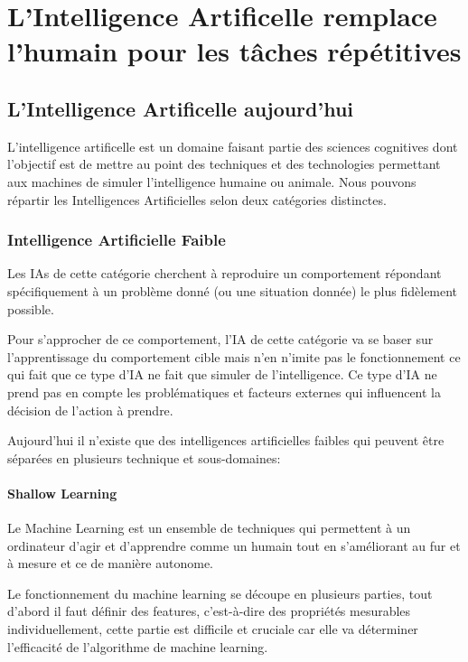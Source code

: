 \part{L'Intelligence Artificelle remplace l'humain pour les tâches répétitives}
\chapter{L'Intelligence Artificelle aujourd'hui}
    L'intelligence artificelle est un domaine faisant partie
    des sciences cognitives dont l'objectif est de mettre au
    point des techniques et des technologies permettant aux
    machines de simuler l'intelligence humaine ou animale.
    Nous pouvons répartir les Intelligences Artificielles selon deux catégories distinctes.

    \section{Intelligence Artificielle Faible}
        Les IAs de cette catégorie cherchent à reproduire un comportement
        répondant spécifiquement à un problème donné (ou une situation donnée)
        le plus fidèlement possible.\newline

        Pour s'approcher de ce comportement, l'IA de cette catégorie
        va se baser sur l'apprentissage du comportement cible
        mais n'en n'imite pas le fonctionnement ce qui fait que
        ce type d'IA ne fait que simuler de l'intelligence.
        Ce type d'IA ne prend pas en compte les problématiques et facteurs externes
        qui influencent la décision de l'action à prendre. \newline

        Aujourd'hui il n'existe que des intelligences artificielles faibles qui peuvent
        être séparées en plusieurs technique et sous-domaines: \newline

        \subsection{Shallow Learning}
            Le Machine Learning est un ensemble de techniques qui permettent à un ordinateur
            d'agir et d'apprendre comme un humain tout en s'améliorant au fur et
            à mesure et ce de manière autonome. \newline

            Le fonctionnement du machine learning se découpe en plusieurs parties,
            tout d'abord il faut définir des features, c'est-à-dire des
            propriétés mesurables individuellement, cette partie est difficile et cruciale
            car elle va déterminer l'efficacité de l'algorithme de machine learning. \newline


